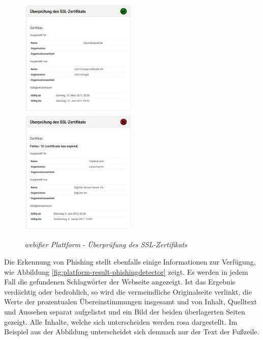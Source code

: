 \begin{figure}[H]
\centerline{%
\includegraphics[width=0.5\textwidth]{images/platform/certificatechecker-clean}%
\includegraphics[width=0.5\textwidth]{images/platform/certificatechecker-malicious}%
}%
\caption{\textit{webifier Plattform} - \textit{Überprüfung des SSL-Zertifikats}}
\label{fig:platform-result-certificatechecker}
\end{figure}

\newpage

Die Erkennung von Phishing stellt ebenfalls einige Informationen zur Verfügung, wie Abbildung
\ref{fig:platform-result-phishingdetector} zeigt. Es werden in jedem Fall die gefundenen
Schlagwörter der Webseite angezeigt. Ist das Ergebnis verdächtig oder bedrohlich, so wird die
vermeindliche Originalseite verlinkt, die Werte der prozentualen Übereinstimmungen insgesamt und
von Inhalt, Quelltext und Aussehen separat aufgelistst und ein Bild der beiden überlagerten Seiten
gezeigt. Alle Inhalte, welche sich unterscheiden werden rosa dargestellt. Im Beispiel aus der
Abbildung unterscheidet sich demnach nur der Text der Fußzeile.

